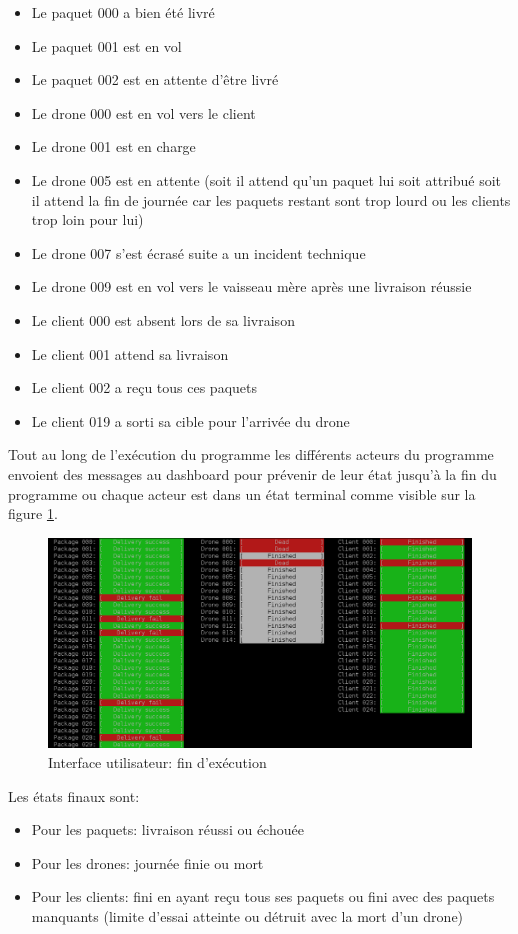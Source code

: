 \documentclass[article, backcover, french, nodocumentinfo]{upmethodology-document}
\begin{document}
					\begin{itemize}
						\item Le paquet 000 a bien été livré
						\item Le paquet 001 est en vol
						\item Le paquet 002 est en attente d’être livré
						\item Le drone 000 est en vol vers le client
						\item Le drone 001 est en charge
						\item Le drone 005 est en attente (soit il attend qu'un paquet lui soit attribué soit il attend la fin de journée car les paquets restant sont trop lourd ou les clients trop loin pour lui)
						\item Le drone 007 s'est écrasé suite a un incident technique
						\item Le drone 009 est en vol vers le vaisseau mère après une livraison réussie
						\item Le client 000 est absent lors de sa livraison
						\item Le client 001 attend sa livraison
						\item Le client 002 a reçu tous ces paquets
						\item Le client 019 a sorti sa cible pour l'arrivée du drone
					\end{itemize}
					Tout au long de l’exécution du programme les différents acteurs du programme envoient des messages au dashboard pour prévenir de leur état jusqu’à la fin du programme ou chaque acteur est dans un état terminal comme visible sur la figure \ref{fig:UIend}.
					\begin{figure}[H]
						\centering
						\includegraphics[width=\textwidth]{figures/UI2}
						\caption{Interface utilisateur: fin d’exécution}
						\label{fig:UIend}
					\end{figure}
					Les états finaux sont:
					\begin{itemize}
						\item Pour les paquets: livraison réussi ou échouée
						\item Pour les drones: journée finie ou mort
						\item Pour les clients: fini en ayant reçu tous ses paquets ou fini avec des paquets manquants (limite d'essai atteinte ou détruit avec la mort d'un drone)
					\end{itemize}
\end{document}
